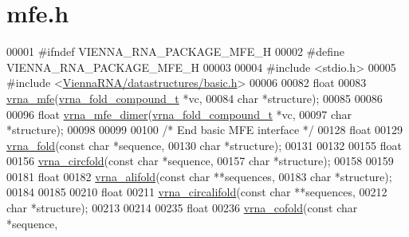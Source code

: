 \hypertarget{mfe_8h_source}{}\section{mfe.\+h}
\label{mfe_8h_source}

\begin{DoxyCode}
00001 \textcolor{preprocessor}{#ifndef VIENNA\_RNA\_PACKAGE\_MFE\_H}
00002 \textcolor{preprocessor}{#define VIENNA\_RNA\_PACKAGE\_MFE\_H}
00003 
00004 \textcolor{preprocessor}{#include <stdio.h>}
00005 \textcolor{preprocessor}{#include <\hyperlink{datastructures_2basic_8h}{ViennaRNA/datastructures/basic.h}>}
00006 
00082 \textcolor{keywordtype}{float}
00083 \hyperlink{group__mfe__global_gabd3b147371ccf25c577f88bbbaf159fd}{vrna\_mfe}(\hyperlink{group__fold__compound_structvrna__fc__s}{vrna\_fold\_compound\_t} *vc,
00084          \textcolor{keywordtype}{char}                 *structure);
00085 
00086 
00096 \textcolor{keywordtype}{float} \hyperlink{group__mfe__global_gaab22d10c1190f205f16a77cab9d5d3ee}{vrna\_mfe\_dimer}(\hyperlink{group__fold__compound_structvrna__fc__s}{vrna\_fold\_compound\_t} *vc,
00097                      \textcolor{keywordtype}{char}                 *structure);
00098 
00099 
00100 \textcolor{comment}{/* End basic MFE interface */}
00128 \textcolor{keywordtype}{float}
00129 \hyperlink{group__mfe__global_ga29a33b2895f4e67b0480271ff289afdc}{vrna\_fold}(\textcolor{keyword}{const} \textcolor{keywordtype}{char}  *sequence,
00130           \textcolor{keywordtype}{char}        *structure);
00131 
00132 
00155 \textcolor{keywordtype}{float}
00156 \hyperlink{group__mfe__global_gaf973483d8acbc8cc9aacfc8a9b7f0074}{vrna\_circfold}(\textcolor{keyword}{const} \textcolor{keywordtype}{char}  *sequence,
00157               \textcolor{keywordtype}{char}        *structure);
00158 
00159 
00181 \textcolor{keywordtype}{float}
00182 \hyperlink{group__mfe__global_ga6c9d3bef3e92c6d423ffac9f981418c1}{vrna\_alifold}(\textcolor{keyword}{const} \textcolor{keywordtype}{char} **sequences,
00183              \textcolor{keywordtype}{char}       *structure);
00184 
00185 
00210 \textcolor{keywordtype}{float}
00211 \hyperlink{group__mfe__global_ga17a1be7490468c29c335ba9bffacba53}{vrna\_circalifold}(\textcolor{keyword}{const} \textcolor{keywordtype}{char} **sequences,
00212                  \textcolor{keywordtype}{char}       *structure);
00213 
00214 
00235 \textcolor{keywordtype}{float}
00236 \hyperlink{group__mfe__global_ga9ef3a297201dbf838a8daff2b45c0c82}{vrna\_cofold}(\textcolor{keyword}{const} \textcolor{keywordtype}{char}  *sequence,

\end{DoxyCode}
